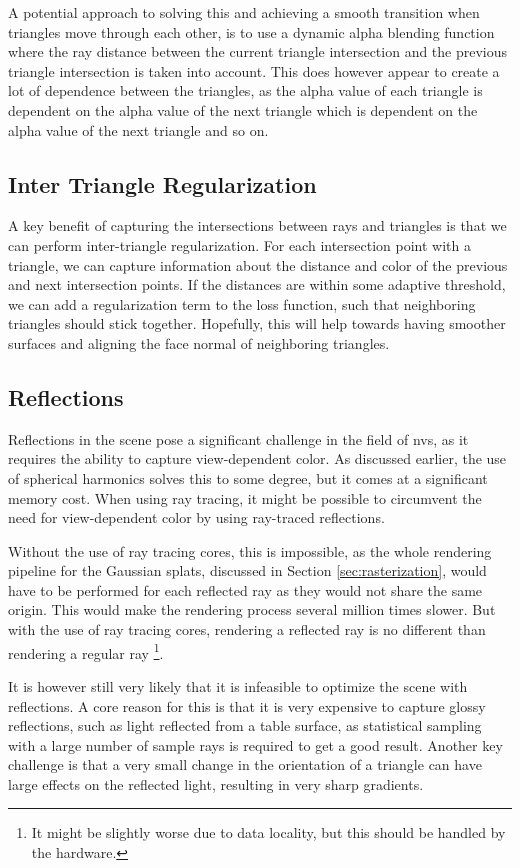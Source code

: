A potential approach to solving this and achieving a smooth transition when triangles move through each other,
is to use a dynamic alpha blending function where the ray distance between the current triangle intersection and the previous triangle intersection is taken into account.
This does however appear to create a lot of dependence between the triangles, as the alpha value of each triangle is dependent on the alpha value of the next triangle which is dependent on the alpha value of the next triangle and so on.


\subsection{Inter Triangle Regularization}
A key benefit of capturing the intersections between rays and triangles is that we can perform inter-triangle regularization.
For each intersection point with a triangle, we can capture information about the distance and color of the previous and next intersection points.
If the distances are within some adaptive threshold, we can add a regularization term to the loss function, such that neighboring triangles should stick together.
Hopefully, this will help towards having smoother surfaces and aligning the face normal of neighboring triangles.

\subsection{Reflections}
Reflections in the scene pose a significant challenge in the field of \gls{nvs}, as it requires the ability to capture view-dependent color.
As discussed earlier, the use of spherical harmonics solves this to some degree, but it comes at a significant memory cost.
When using ray tracing, it might be possible to circumvent the need for view-dependent color by using ray-traced reflections.

Without the use of ray tracing cores, this is impossible, as the whole rendering pipeline for the Gaussian splats, discussed in Section \ref{sec:rasterization}, would have to be performed for each reflected ray as they would not share the same origin.
This would make the rendering process several million times slower.
But with the use of ray tracing cores, rendering a reflected ray is no different than rendering a regular ray \footnote{It might be slightly worse due to data locality, but this should be handled by the hardware.}.

It is however still very likely that it is infeasible to optimize the scene with reflections.
A core reason for this is that it is very expensive to capture glossy reflections, such as light reflected from a table surface, as statistical sampling with a large number of sample rays is required to get a good result.
Another key challenge is that a very small change in the orientation of a triangle can have large effects on the reflected light, resulting in very sharp gradients.


